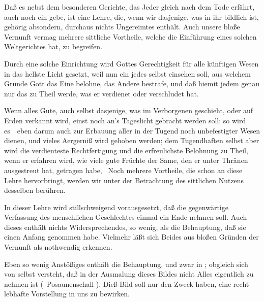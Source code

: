 \begin{aufza}
\begin{aufzb}
\begin{aufzc}
\end{aufzc}
\end{aufzb}
\item Daß es nebst dem besonderen Gerichte, das Jeder gleich nach dem Tode erfährt, auch noch ein  gebe, ist eine Lehre, die, wenn wir dasjenige, was in ihr bildlich ist, gehörig absondern, durchaus nichts Ungereimtes enthält. Auch unsere bloße Vernunft vermag mehrere sittliche Vortheile, welche die Einführung eines solchen Weltgerichtes hat, zu begreifen.
\begin{aufzb}
\item Durch eine solche Einrichtung wird Gottes Gerechtigkeit für alle künftigen Wesen in das hellste Licht gesetzt, weil nun ein jedes selbst einsehen soll, aus welchem Grunde Gott das Eine belohne, das Andere bestrafe, und daß hiemit jedem genau nur das zu Theil werde, was er verdienet oder verschludet hat.
\item Wenn alles Gute, auch selbst dasjenige, was im Verborgenen geschieht, oder auf Erden verkannt wird, einst noch an's Tageslicht gebracht werden soll: so wird es~\ eben darum auch zur Erbauung aller in der Tugend noch unbefestigter Wesen dienen, und vieles Aergerniß wird gehoben werden; dem Tugendhaften selbst aber wird die verdienteste Rechtfertigung und die erfreulichste Belohnung zu Theil, wenn er erfahren wird, wie viele gute Früchte der Same, den er unter Thränen ausgestreut hat, getragen habe, \usw\ Noch mehrere Vortheile, die schon  an diese Lehre hervorbringt, werden wir unter der Betrachtung des sittlichen Nutzens desselben berühren.
\end{aufzb}
In dieser Lehre wird stillschweigend vorausgesetzt, daß die gegenwärtige Verfassung des menschlichen Geschlechtes einmal ein Ende nehmen soll. Auch dieses enthält nichts Widersprechendes, so wenig, als die Behauptung, daß sie einen Anfang genommen habe. Vielmehr läßt sich Beides aus bloßen Gründen der Vernunft als nothwendig erkennen.\par
Eben so wenig Anstößiges enthält die Behauptung,  und zwar in  \usw ; obgleich sich von selbst versteht, daß in der Ausmalung dieses Bildes nicht Alles eigentlich zu nehmen ist (\zB\ Posaunenschall \usw ). Dieß Bild soll nur den Zweck haben, eine recht lebhafte Vorstellung in uns zu bewirken.\par

\end{aufza}
